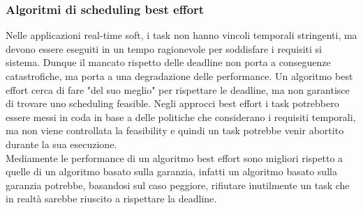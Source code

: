 \documentclass[12pt]{article}
\begin{document}
\subsubsection{Algoritmi di scheduling best effort}
Nelle applicazioni real-time soft, i task non hanno vincoli temporali stringenti, ma devono essere eseguiti in un tempo ragionevole per soddisfare i requisiti si sistema.
Dunque il mancato rispetto delle deadline non porta a conseguenze catastrofiche, ma porta a una degradazione delle performance.
Un algoritmo best effort cerca di fare "del suo meglio" per rispettare le deadline, ma non garantisce di trovare uno scheduling feasible.
Negli approcci best effort i task potrebbero essere messi in coda in base a delle politiche che considerano i requisiti temporali, ma non viene controllata la feasibility e quindi un task potrebbe venir abortito durante la sua esecuzione.\\
Mediamente le performance di un algoritmo best effort sono migliori rispetto a quelle di un algoritmo basato sulla garanzia, infatti un algoritmo basato sulla garanzia
potrebbe, basandosi sul caso peggiore, rifiutare inutilmente un task che in realtà sarebbe riuscito a rispettare la deadline.
\end{document}
